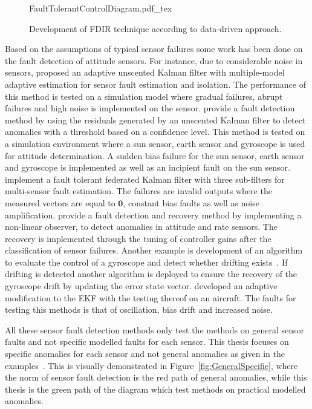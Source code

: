 \begin{figure}[h!t!b]
	\centering
	\def\svgwidth{14cm}
	{FaultTolerantControlDiagram.pdf_tex}
	\caption{Development of FDIR technique according to data-driven approach.}
	\label{fig:FaultTolerantControlDiagram}
\end{figure}

Based on the assumptions of typical sensor failures some work has been done on the fault detection of attitude sensors. For instance, due to considerable noise in sensors, \cite{wang2019adaptive} proposed an adaptive unscented Kalman filter with multiple-model adaptive estimation for sensor fault estimation and isolation. The performance of this method is tested on a simulation model where gradual failures, abrupt failures and high noise is implemented on the sensor. \cite{Xiong2007} provide a fault detection method by using the residuals generated by an unscented Kalman filter to detect anomalies with a threshold based on a confidence level. This method is tested on a simulation environment where a sun sensor, earth sensor and gyroscope is used for attitude determination. A sudden bias failure for the sun sensor, earth sensor and gyroscope is implemented as well as an incipient fault on the sun sensor. \cite{Zhou2016} implement a fault tolerant federated Kalman filter with three sub-filters for multi-sensor fault estimation. The failures are invalid outputs where the measured vectors are equal to $\mathbf{0}$, constant bias faults as well as noise amplification.  \cite{Nasrolahi2018} provide a fault detection and recovery method by implementing a non-linear observer, to detect anomalies in attitude and rate sensors. The recovery is implemented through the tuning of controller gains after the classification of sensor failures. Another example is development of an algorithm to evaluate the control of a gyroscope and detect whether drifting exists~\cite{carvajal2017agent}. If drifting is detected another algorithm is deployed to ensure the recovery of the gyroscope drift by updating the error state vector. \cite{van2012sensor} developed an adaptive modification to the EKF with the testing thereof on an aircraft. The faults for testing this methods is that of oscillation, bias drift and increased noise.

All these sensor fault detection methods only test the methods on general sensor faults and not specific modelled faults for each sensor. This thesis focuses on specific anomalies for each sensor and not general anomalies as given in the examples~\cite{wang2019adaptive,Xiong2007,Zhou2016,Nasrolahi2018,carvajal2017agent, van2012sensor}. This is visually demonstrated in Figure~\ref{fig:GeneralSpecific}, where the norm of sensor fault detection is the red path of general anomalies, while this thesis is the green path of the diagram which test methods on practical modelled anomalies.


